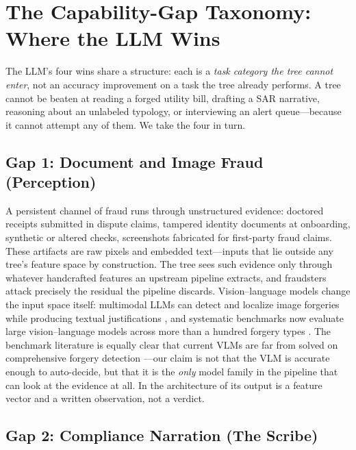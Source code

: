 \section{The Capability-Gap Taxonomy: Where the LLM Wins}
\label{sec:p8-taxonomy}

The LLM's four wins share a structure: each is a \emph{task category the tree
cannot enter}, not an accuracy improvement on a task the tree already
performs. A tree cannot be beaten at reading a forged utility bill, drafting a
SAR narrative, reasoning about an unlabeled typology, or interviewing an alert
queue---because it cannot attempt any of them. We take the four in turn.

\subsection{Gap 1: Document and Image Fraud (Perception)}
\label{sec:p8-gap-docs}

A persistent channel of fraud runs through unstructured evidence:
doctored receipts submitted in dispute claims, tampered identity documents at
onboarding, synthetic or altered checks, screenshots fabricated for
first-party fraud claims. These artifacts are raw pixels and embedded
text---inputs that lie outside any tree's feature space by construction. The
tree sees such evidence only through whatever handcrafted features an upstream
pipeline extracts, and fraudsters attack precisely the residual the pipeline
discards. Vision--language models change the input space itself: multimodal
LLMs can detect and localize image forgeries while producing textual
justifications \citep{xu2024fakeshield}, and systematic benchmarks now
evaluate large vision--language models across more than a hundred forgery
types \citep{wang2025forensicsbench}. The benchmark literature is equally
clear that current VLMs are far from solved on comprehensive forgery
detection \citep{wang2025forensicsbench}---our claim is not that the VLM is
accurate enough to auto-decide, but that it is the \emph{only} model family in
the pipeline that can look at the evidence at all. In the architecture of
 its output is a feature vector and a written
observation, not a verdict.

\subsection{Gap 2: Compliance Narration (The Scribe)}
\label{sec:p8-gap-narration}

